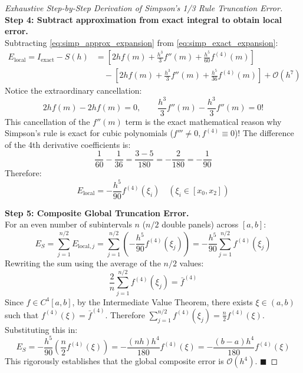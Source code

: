 \begin{proof}[Exhaustive Step-by-Step Derivation of Simpson's 1/3 Rule Truncation Error]
\noindent\textbf{Step 4: Subtract approximation from exact integral to obtain local error.} \\
Subtracting \eqref{eq:simp_approx_expansion} from \eqref{eq:simp_exact_expansion}:
\begin{align}
    E_{\text{local}} = I_{\text{exact}} - S(h) &= \left[ 2h f(m) + \frac{h^3}{3} f''(m) + \frac{h^5}{60} f^{(4)}(m) \right] \nonumber \\
    &\quad - \left[ 2h f(m) + \frac{h^3}{3} f''(m) + \frac{h^5}{36} f^{(4)}(m) \right] + \mathcal{O}(h^7)
\end{align}
Notice the extraordinary cancellation:
\begin{equation}
    2h f(m) - 2h f(m) = 0, \qquad \frac{h^3}{3} f''(m) - \frac{h^3}{3} f''(m) = 0!
\end{equation}
This cancellation of the $f''(m)$ term is the exact mathematical reason why Simpson's rule is exact for cubic polynomials ($f''' \ne 0, f^{(4)} \equiv 0$)!
The difference of the 4th derivative coefficients is:
\begin{equation}
    \frac{1}{60} - \frac{1}{36} = \frac{3 - 5}{180} = -\frac{2}{180} = -\frac{1}{90}
\end{equation}
Therefore:
\begin{equation}
    \boxed{E_{\text{local}} = -\frac{h^5}{90} f^{(4)}(\xi_i)} \quad (\xi_i \in [x_0, x_2])
\end{equation}

\noindent\textbf{Step 5: Composite Global Truncation Error.} \\
For an even number of subintervals $n$ ($n/2$ double panels) across $[a, b]$:
\begin{equation}
    E_S = \sum_{j=1}^{n/2} E_{\text{local}, j} = \sum_{j=1}^{n/2} \left( -\frac{h^5}{90} f^{(4)}(\xi_j) \right) = -\frac{h^5}{90} \sum_{j=1}^{n/2} f^{(4)}(\xi_j)
\end{equation}
Rewriting the sum using the average of the $n/2$ values:
\begin{equation}
    \frac{2}{n} \sum_{j=1}^{n/2} f^{(4)}(\xi_j) = \bar{f}^{(4)}
\end{equation}
Since $f \in C^4[a, b]$, by the Intermediate Value Theorem, there exists $\xi \in (a, b)$ such that $f^{(4)}(\xi) = \bar{f}^{(4)}$.
Therefore $\sum_{j=1}^{n/2} f^{(4)}(\xi_j) = \frac{n}{2} f^{(4)}(\xi)$. Substituting this in:
\begin{equation}
    E_S = -\frac{h^5}{90} \left( \frac{n}{2} f^{(4)}(\xi) \right) = -\frac{(n h) h^4}{180} f^{(4)}(\xi) = \boxed{-\frac{(b - a) h^4}{180} f^{(4)}(\xi)}
\end{equation}
This rigorously establishes that the global composite error is $\mathcal{O}(h^4)$. $\blacksquare$
\end{proof}


